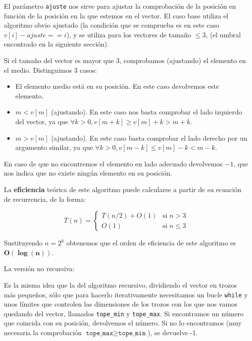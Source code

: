 El parámetro \texttt{ajuste} nos sirve para ajustar la comprobación de la posición en función de la posición en la que estemos en el vector.
El caso base utiliza el algoritmo obvio ajustado (la condición que se comprueba es en este caso $v[i]-ajuste == i$), y se utiliza para los vectores de tamaño $\leq 3$, (el umbral encontrado en la siguiente sección).

Si el tamaño del vector es mayor que 3, comprobamos (ajustando) el elemento en el medio.
Distinguimos 3 casos:

\begin{itemize}
  \item El elemento medio está en su posición. En este caso devolvemos este elemento.
  \item $m < v[m]$ (ajustando). En este caso nos basta comprobar el lado izquierdo del vector, ya que $\forall k > 0, v[m + k] \geq v[m] + k > m + k$.
  \item $m > v[m]$ (ajustando). En este caso basta comprobar el lado derecho por un argumento similar, ya que $\forall k > 0, v[m - k] \leq v[m] - k < m - k$.
\end{itemize}

En caso de que no encontremos el elemento en lado adecuado devolvemos $-1$, que nos indica que no existe ningún elemento en su posición.

La \textbf{eficiencia} teórica de este algoritmo puede calcularse a partir de su ecuación de recurrencia, de la forma:

\[
T(n) = \begin{cases} T(n/2) + O(1) & \mbox{si } n > 3 \\
O(1) & \mbox{si } n \leq 3 \end{cases}\]

Sustituyendo $n = 2^k$ obtenemos que el orden de eficiencia de este algoritmo es $\mathbf{O(\log(n))}$.

\vspace*{1cm}
\hrulefill
\vspace*{1cm}

La versión no recursiva:




Es la misma idea que la del algoritmo recursivo, dividiendo el vector en trozos más pequeños, sólo que para hacerlo iterativamente necesitamos un bucle \texttt{while} y unos límites que controlen las dimensiones de los trozos con los que nos vamos quedando del vector, llamados \texttt{tope_min} y \texttt{tope_max}.  Si encontramos un número que coincida con su posición, devolvemos el número. Si no lo encontramos (muy necesaria la comprobación $\texttt{tope_max} \geq \texttt{tope_min}$), se devuelve -1.

